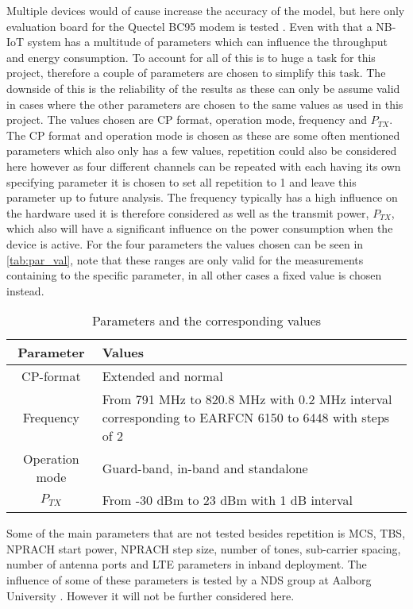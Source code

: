 Multiple devices would of cause increase the accuracy of the model, but here only evaluation board for the Quectel BC95 modem is tested \citep{BC95}. Even with that a \gls{NB-IoT} system has a multitude of parameters which can influence the throughput and energy consumption. To account for all of this is to huge a task for this project, therefore a couple of parameters are chosen to simplify this task. The downside of this is the reliability of the results as these can only be assume valid in cases where the other parameters are chosen to the same values as used in this project. The values chosen are CP format, operation mode, frequency and $P_{TX}$. The CP format and operation mode is chosen as these are some often mentioned parameters which also only has a few values, repetition could also be considered here however as four different channels can be repeated with each having its own specifying parameter it is chosen to set all repetition to 1 and leave this parameter up to future analysis. The frequency typically has a high influence on the hardware used it is therefore considered as well as the transmit power, $P_{TX}$, which also will have a significant influence on the power consumption when the device is active. For the four parameters the values chosen can be seen in \autoref{tab:par_val}, note that these ranges are only valid for the measurements containing to the specific parameter, in all other cases a fixed value is chosen instead.

\begin{table}[H]
\centering
\begin{tabular}{|c|p{8cm}|} \hline
\textbf{Parameter} & \textbf{Values} \\ \hline
CP-format & Extended and normal\\ \hline
Frequency & From 791 MHz to 820.8 MHz with 0.2 MHz interval corresponding to EARFCN 6150 to 6448 with steps of 2 \\ \hline
Operation mode & Guard-band, in-band and standalone \\ \hline
$P_{TX}$ & From -30 dBm to 23 dBm with 1 dB interval \\ \hline
\end{tabular}
\caption{Parameters and the corresponding values}
\label{tab:par_val}
\end{table}

Some of the main parameters that are not tested besides repetition is \gls{MCS}, \gls{TBS}, NPRACH start power, NPRACH step size, number of tones, sub-carrier spacing, number of antenna ports and LTE parameters in inband deployment. The influence of some of these parameters is tested by a NDS group at Aalborg University . However it will not be further considered here.

